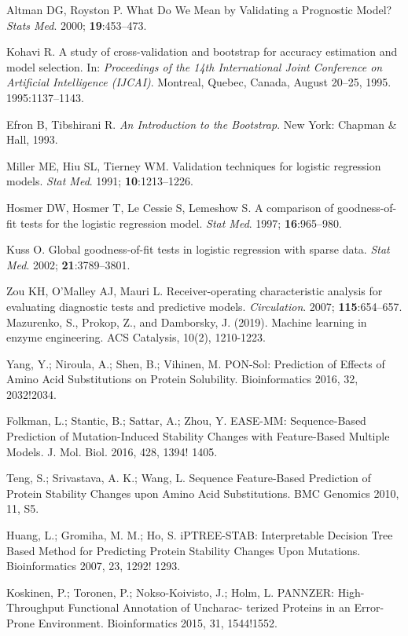 \documentclass[12pt]{article}
\begin{document}
\begin{thebibliography}{99}
Altman DG, Royston P. What Do We Mean by Validating a Prognostic Model? \textit{Stats Med}. 2000; \textbf{19}:453–473.

Kohavi R. A study of cross-validation and bootstrap for accuracy estimation and model selection. In: \textit{Proceedings of the 14th International Joint Conference on Artificial Intelligence (IJCAI)}. Montreal, Quebec, Canada, August 20–25, 1995. 1995:1137–1143.

Efron B, Tibshirani R. \textit{An Introduction to the Bootstrap}. New York: Chapman \& Hall, 1993.

Miller ME, Hiu SL, Tierney WM. Validation techniques for logistic regression models. \textit{Stat Med}. 1991; \textbf{10}:1213–1226.

Hosmer DW, Hosmer T, Le Cessie S, Lemeshow S. A comparison of goodness-of-fit tests for the logistic regression model. \textit{Stat Med}. 1997; \textbf{16}:965–980.

Kuss O. Global goodness-of-fit tests in logistic regression with sparse data. \textit{Stat Med}. 2002; \textbf{21}:3789–3801.

Zou KH, O'Malley AJ, Mauri L. Receiver-operating characteristic analysis for evaluating diagnostic tests and predictive models. \textit{Circulation}. 2007; \textbf{115}:654–657.
Mazurenko, S., Prokop, Z., and Damborsky, J. (2019). Machine learning in enzyme engineering. ACS Catalysis, 10(2), 1210-1223. 

 Yang, Y.; Niroula, A.; Shen, B.; Vihinen, M. PON-Sol: Prediction of Effects of Amino Acid Substitutions on Protein Solubility. Bioinformatics 2016, 32, 2032!2034.

 Folkman, L.; Stantic, B.; Sattar, A.; Zhou, Y. EASE-MM: Sequence-Based Prediction of Mutation-Induced Stability Changes with Feature-Based Multiple Models. J. Mol. Biol. 2016, 428, 1394! 1405.

 Teng, S.; Srivastava, A. K.; Wang, L. Sequence Feature-Based Prediction of Protein Stability Changes upon Amino Acid Substitutions. BMC Genomics 2010, 11, S5.

 Huang, L.; Gromiha, M. M.; Ho, S. iPTREE-STAB: Interpretable Decision Tree Based Method for Predicting Protein Stability Changes Upon Mutations. Bioinformatics 2007, 23, 1292! 1293.


 Koskinen, P.; Toronen, P.; Nokso-Koivisto, J.; Holm, L. PANNZER: High-Throughput Functional Annotation of Uncharac- terized Proteins in an Error-Prone Environment. Bioinformatics 2015, 31, 1544!1552.


\end{thebibliography}
\end{document}
